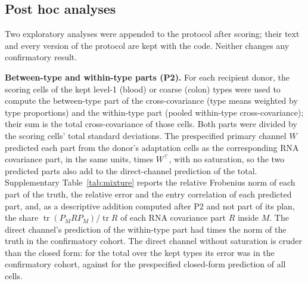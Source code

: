 \begin{table}[h]
\centering
\caption{\textbf{Cross-study transfer: donor-mean relative error of the predicted
cross-correlation matrix.} Interactions were learned in the training study and
applied unchanged; the own paired half uses the recipient's adaptation pairs,
which the setting does not permit. Type columns centre every cell by its
cell-type mean in both assays. The last column is the mean correlation between
predicted and held-out entries in colon (all cells).}
\label{tab:cross}
\small

\end{table}

\subsection*{Post hoc analyses}
Two exploratory analyses were appended to the protocol after scoring; their
text and every version of the
protocol are kept with the code. Neither changes any confirmatory result.

\textbf{Between-type and within-type parts (P2).} For each recipient donor, the
scoring cells of the kept level-1 (blood) or coarse (colon) types were used to
compute the between-type part of the cross-covariance (type means weighted by
type proportions) and the within-type part (pooled within-type
cross-covariance); their sum is the total cross-covariance of those cells. Both
parts were divided by the scoring cells' total standard deviations. The prespecified
primary channel $W$ predicted each part from the donor's adaptation cells as
the corresponding RNA covariance part, in the same units, times $W^\top$, with
no saturation, so the two predicted parts also add to the direct-channel
prediction of the total. Supplementary Table~\ref{tab:mixture} reports the relative
Frobenius norm of each part of the truth, the relative error and the entry
correlation of each predicted part, and, as a descriptive addition computed
after P2 and not part of its plan, the share
$\operatorname{tr}(P_MR P_M)/\operatorname{tr}R$ of each RNA covariance part $R$
inside $M$. The direct channel's prediction of the within-type part had
\XsMixHaoNormWithin{} times the norm of the truth in the confirmatory cohort. The
direct channel without saturation is cruder than the closed form: for the total
over the kept types its error was \XsMixHaoErrDirect{} in the confirmatory cohort,
against \XsHaoErrPfMeans{} for the prespecified closed-form prediction of all cells.

\begin{table}[h]
\centering
\caption{\textbf{Between-type and within-type parts of the cross-covariance.}
Donor means. Norm share, Frobenius norm of each part of the scoring cells'
cross-covariance relative to the total (the parts are not orthogonal, so the
shares need not sum to one). Relative error and entry correlation, the prespecified
pairing-free channel's prediction of each part. Share inside $S$, fraction of
the corresponding RNA covariance of the adaptation cells inside the effective
supported subspace (descriptive addition).}
\label{tab:mixture}
\small

\end{table}

